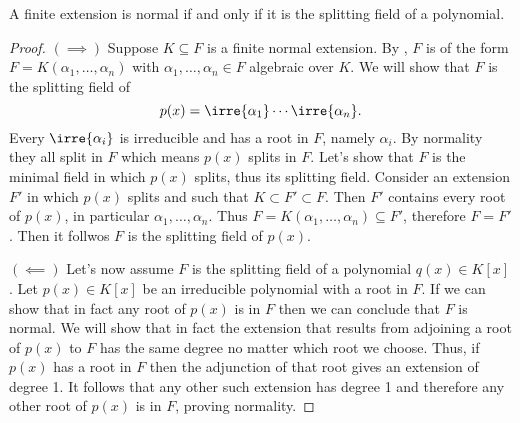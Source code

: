 \documentclass[12pt,oneside]{book}
\begin{document}
\begin{theorem}
	A finite extension is normal if and only if it is the splitting field of a polynomial.
\end{theorem}
\begin{proof}
	\( (\implies) \) Suppose \( K \subseteq F \) is a finite normal extension. By
	, \( F \) is of the form \( F =
	K(\alpha_1, \dots, \alpha_n) \) with \( \alpha_1, \dots, \alpha_n \in F \) algebraic
	over \( K \). We will show that \( F \) is the splitting field of
	\begin{equation*}
		p(x) = \irre{\alpha_1}\cdots\irre{\alpha_n}.
	\end{equation*}
	Every	\( \irre{\alpha_i} \) is irreducible and has a root in \( F \), namely \( \alpha_i
	\). By normality they all split in \( F \) which means \( p(x) \) splits in \( F \).
	Let's show that \( F \) is the minimal field in which \( p(x) \) splits, thus its
	splitting field. Consider an extension \( F' \) in which \( p(x) \) splits and such that
	\( K \subset F' \subset F \). Then \( F' \) contains every root of \( p(x) \), in
	particular \( \alpha_1, \dots, \alpha_n \). Thus \( F = K(\alpha_1, \dots, \alpha_n)
	\subseteq F' \), therefore \( F = F' \). Then it follwos \( F \) is the splitting field
	of \( p(x) \).

	\( (\impliedby) \) Let's now assume \( F \) is the splitting field of a polynomial \(
	q(x) \in K[x] \). Let \( p(x) \in K[x] \) be an
	irreducible polynomial with a root in \( F \). If we can show that in fact any
	root of \( p(x) \) is in \( F \) then we can conclude that \( F \) is normal. We will
	show that in fact the extension that results from adjoining a root of \( p(x) \) to \( F
	\) has the same degree no matter which root we choose. Thus, if \( p(x) \) has a root in
	\( F \) then the adjunction of that root gives an extension of degree 1. It follows that
	any other such extension has degree 1 and therefore any other root of \( p(x) \) is in
	\( F \), proving normality.


\end{proof}
\end{document}
